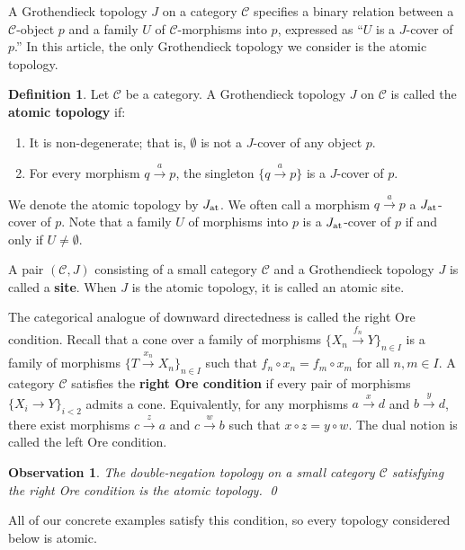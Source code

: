 \documentclass[10pt]{amsart}
\numberwithin{equation}{section}
\theoremstyle{plain}
\newtheorem{obs}[theorem]{Observation}
\theoremstyle{definition}
\newtheorem{definition}[theorem]{Definition}
\newcommand{\C}{\mathcal{C}}
\newcommand{\edge}[1]{\overset{#1}{\longrightarrow}}
\newcommand{\xedge}[1]{\xrightarrow{#1}}
\begin{document}
A Grothendieck topology $J$ on a category $\C$ specifies a binary relation between a $\C$-object $p$ and a family $U$ of $\C$-morphisms into $p$, expressed as ``$U$ is a $J$-cover of $p$.''
In this article, the only Grothendieck topology we consider is the atomic topology.




\begin{definition}
Let $\C$ be a category.
A Grothendieck topology $J$ on $\C$ is called the {\bf atomic topology} if:
\begin{enumerate}
\item It is non-degenerate; that is, $\emptyset$ is not a $J$-cover of any object $p$.
\item For every morphism $q\edge{a}p$, the singleton $\{q\edge{a}p\}$ is a $J$-cover of $p$.
\end{enumerate}

We denote the atomic topology by $J_{\rm at}$.
We often call a morphism $q\edge{a}p$ a $J_{\rm at}$-cover of $p$.
Note that a family $U$ of morphisms into $p$ is a $J_{\rm at}$-cover of $p$ if and only if $U\not=\emptyset$.
\end{definition}





A pair $(\C,J)$ consisting of a small category $\C$ and a Grothendieck topology $J$ is called a {\bf site}.
When $J$ is the atomic topology, it is called an atomic site.

The categorical analogue of downward directedness is called the right Ore condition.
Recall that a cone over a family of morphisms $\{X_n\xedge{f_n} Y\}_{n\in I}$ is a family of morphisms $\{T\xedge{x_n} X_n\}_{n\in I}$ such that $f_n\circ x_n=f_m\circ x_m$ for all $n,m\in I$.
A category $\mathcal{C}$ satisfies the {\bf right Ore condition} if every pair of morphisms $\{ X_i\to Y\}_{i<2}$ admits a cone.
Equivalently, for any morphisms $a\edge{x}d$ and $b\edge{y}d$, there exist morphisms $c\edge{z}a$ and $c\edge{w}b$ such that $x\circ z=y\circ w$.
The dual notion is called the left Ore condition.


\begin{obs}\label{obs:right-Ore-dense-atomic}
The double-negation topology on a small category $\mathcal{C}$ satisfying the right Ore condition is the atomic topology.
\qed
\end{obs}

All of our concrete examples satisfy this condition, so every topology considered below is atomic.
\end{document}
